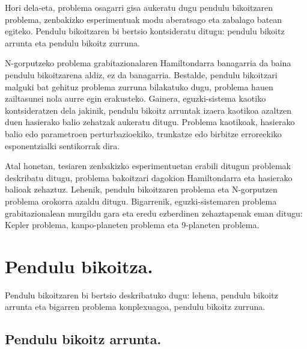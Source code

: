 Hori dela-eta, problema osagarri gisa aukeratu dugu pendulu bikoitzaren problema, zenbakizko esperimentuak modu aberatsago eta zabalago batean egiteko. Pendulu bikoitzaren bi bertsio kontsideratu ditugu: pendulu bikoitz arrunta eta pendulu bikoitz zurruna.

N-gorputzeko problema grabitazionalaren Hamiltondarra banagarria da baina pendulu bikoitzarena aldiz, ez da banagarria. Bestalde, pendulu bikoitzari malguki bat gehituz  problema zurruna bilakatuko dugu, problema hauen zailtasunei nola aurre egin erakusteko. Gainera,  eguzki-sistema kaotiko \cite{Laskar1999}  kontsideratzen dela  jakinik, pendulu bikoitz arruntak izaera kaotikoa azaltzen duen hasierako balio zehatzak aukeratu ditugu. Problema kaotikoak,  hasierako balio edo parametroen perturbazioekiko, trunkatze edo birbitze erroreekiko esponentzialki sentikorrak dira.

Atal honetan, tesiaren zenbakizko esperimentuetan erabili ditugun problemak deskribatu ditugu, problema bakoitzari dagokion Hamiltondarra eta hasierako balioak zehaztuz. Lehenik, pendulu bikoitzaren problema eta N-gorputzen problema orokorra azaldu ditugu. Bigarrenik, eguzki-sistemaren problema grabitazionalean murgildu gara eta eredu ezberdinen zehaztapenak eman ditugu: Kepler problema, kanpo-planeten problema eta 9-planeten problema. 

\section{Pendulu bikoitza.}
\label{s:32}

Pendulu bikoitzaren bi bertsio deskribatuko dugu: lehena, pendulu bikoitz arrunta eta bigarren problema konplexuagoa, pendulu bikoitz zurruna. 

\subsection{Pendulu bikoitz arrunta.}
\label{ss:321}



